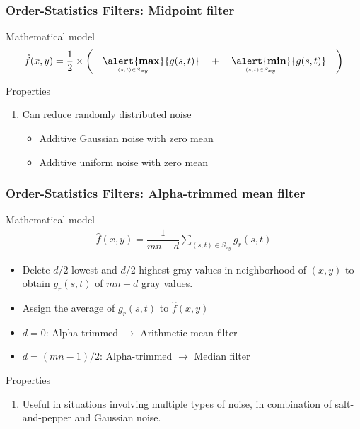 \documentclass[english,11pt,table,handout]{beamer}
\begin{document}
{
	\frametitle{Order-Statistics Filters: Midpoint filter}
	\begin{block}{Mathematical model}
		\begin{align}
		\nonumber
		\hat{f}(x,y) = \frac{1}{2} \times { \left(\quad \underaccent{(s,t) \in S_{xy}}{\text{\alert{\textbf{max}}}}\{{g(s,t)}\}  \quad +  \quad \underaccent{(s,t) \in S_{xy}}{\text{\alert{\textbf{min}}}}\{{g(s,t)}\} \quad \right)}
		\end{align}
	\end{block}
	\begin{alertblock}{Properties}
		\begin{enumerate}
			\item Can reduce randomly distributed noise
			\begin{itemize}
				\item Additive Gaussian noise with zero mean
				\item Additive uniform noise with zero mean
			\end{itemize}
			
		\end{enumerate}
	\end{alertblock}
}
\frame
{
	\frametitle{Order-Statistics Filters: Alpha-trimmed mean filter}
	\begin{block}{Mathematical model}
		\begin{align}
		\nonumber
		\hat{f}(x,y) = \dfrac{1}{mn -d}{\sum\limits_{(s,t) \in S_{xy}}{g_{r}(s,t)}}
		\end{align}
		
		\begin{itemize}
			\item Delete $d/2$ lowest and $d/2$ highest gray values in neighborhood of $(x,y)$ to obtain $g_{r}(s,t)$ of $mn-d$ gray values.
			\item Assign the average of $g_{r}(s,t)$ to $\hat{f}(x,y)$
			\item $d = 0$: Alpha-trimmed $\rightarrow$ Arithmetic mean filter
			\item $d = (mn-1)/2$: Alpha-trimmed $\rightarrow$ Median filter
		\end{itemize}
	\end{block}
	\begin{alertblock}{Properties}
		\begin{enumerate}
			\item Useful in situations involving multiple types of noise, in combination of salt-and-pepper and Gaussian noise.
			
		\end{enumerate}
	\end{alertblock}
}
\end{document}
